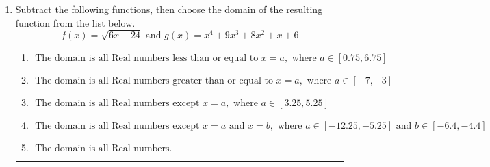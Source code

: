 \documentclass[14pt]{extbook}
\newcommand{\litem}[1]{\item#1\hspace*{-1cm}\rule{\textwidth}{0.4pt}}
\begin{document}
\begin{enumerate}
{\begin{enumerate}[label=\Alph*.]
\end{enumerate} }
\litem{
Subtract the following functions, then choose the domain of the resulting function from the list below.\[ f(x) = \sqrt{6x+24}  \text{ and } g(x) = x^{4} +9 x^{3} +8 x^{2} +x + 6 \]\begin{enumerate}[label=\Alph*.]
\item \( \text{ The domain is all Real numbers less than or equal to } x = a, \text{ where } a \in [0.75, 6.75] \)
\item \( \text{ The domain is all Real numbers greater than or equal to } x = a, \text{ where } a \in [-7, -3] \)
\item \( \text{ The domain is all Real numbers except } x = a, \text{ where } a \in [3.25, 5.25] \)
\item \( \text{ The domain is all Real numbers except } x = a \text{ and } x = b, \text{ where } a \in [-12.25, -5.25] \text{ and } b \in [-6.4, -4.4] \)
\item \( \text{ The domain is all Real numbers. } \)

\end{enumerate} }
\end{enumerate}
\end{document}
